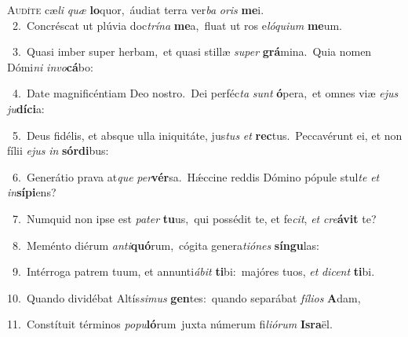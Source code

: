 \lettrine{\initial\textcolor{\initialcolor}{A}}{udíte} cæ\textit{li} \textit{quæ} \textbf{lo}\-quor,~\star áudiat terra ver\textit{ba} \textit{o}\-\textit{ris} \textbf{me}\-i.\\
{\numbfont\textcolor{\numbcolor}{~2.}}~Concréscat ut plúvia doc\-\textit{trí}\-\textit{na} \textbf{me}\-a,~\star fluat ut ros e\-\textit{ló}\-\textit{qui}\textit{um} \textbf{me}\-um.\par
{\numbfont\textcolor{\numbcolor}{~3.}}~Quasi imber super herbam,~\dagger et quasi stillæ \textit{su}\-\textit{per} \textbf{grá}\-mina.~\star Quia nomen Dómi\textit{ni} \textit{in}\-\textit{vo}\textbf{cá}bo:\par
{\numbfont\textcolor{\numbcolor}{~4.}}~Date magnificéntiam Deo nostro.~\dagger Dei perféc\textit{ta} \textit{sunt} \textbf{ó}\-pera,~\star et omnes viæ \textit{e}\-\textit{jus} \textit{ju}\-\textbf{dí}\textbf{ci}a:\par
{\numbfont\textcolor{\numbcolor}{~5.}}~Deus fidélis, et absque ulla iniquitáte, jus\textit{tus} \textit{et} \textbf{rec}\-tus.~\star Peccavérunt ei, et non fílii \textit{e}\-\textit{jus} \textit{in} \textbf{sór}\-\textbf{di}bus:\par
{\numbfont\textcolor{\numbcolor}{~6.}}~Generátio prava at\textit{que} \textit{per}\-\textbf{vér}sa.~\star Hǽccine reddis Dómino pópule stul\textit{te} \textit{et} \textit{in}\-\textbf{sí}\textbf{pi}ens?\par
{\numbfont\textcolor{\numbcolor}{~7.}}~Numquid non ipse est \textit{pa}\-\textit{ter} \textbf{tu}\-us,~\star qui possédit te, et fe\-\textit{cit}\-, \textit{et} \textit{cre}\-\textbf{á}\textbf{vit} te?\par
{\numbfont\textcolor{\numbcolor}{~8.}}~Meménto diérum \textit{an}\-\textit{ti}\textbf{quó}rum,~\star cógita genera\-\textit{ti}\-\textit{ó}\textit{nes} \textbf{sín}\-\textbf{gu}las:\par
{\numbfont\textcolor{\numbcolor}{~9.}}~Intérroga patrem tuum, et annunti\-\textit{á}\-\textit{bit} \textbf{ti}\-bi:~\star majóres tuos, \textit{et} \textit{di}\-\textit{cent} \textbf{ti}\-bi.\par
{\numbfont\textcolor{\numbcolor}{10.}}~Quando dividébat Altís\-\textit{si}\-\textit{mus} \textbf{gen}\-tes:~\star quando separábat \textit{fí}\-\textit{li}\textit{os} \textbf{A}\-dam,\par
{\numbfont\textcolor{\numbcolor}{11.}}~Constítuit términos \textit{po}\-\textit{pu}\textbf{ló}rum~\star juxta númerum fi\-\textit{li}\-\textit{ó}\textit{rum} \textbf{Is}\-\textbf{ra}ël.\par
